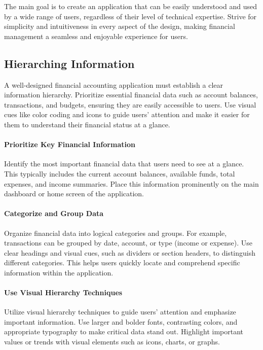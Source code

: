The main goal is to create an application that can be easily understood and used by a wide range of users, 
regardless of their level of technical expertise. Strive for simplicity and intuitiveness in every aspect of the 
design, making financial management a seamless and enjoyable experience for users.


\subsection{Hierarching Information}

A well-designed financial accounting application must establish a clear information hierarchy. Prioritize essential 
financial data such as account balances, transactions, and budgets, ensuring they are easily accessible to users. 
Use visual cues like color coding and icons to guide users' attention and make it easier for them to understand 
their financial status at a glance.

\paragraph{Prioritize Key Financial Information}
Identify the most important financial data that users need to see at a glance. 
This typically includes the current account balances, available funds, total expenses, and income summaries. Place 
this information prominently on the main dashboard or home screen of the application.

\paragraph{Categorize and Group Data}
Organize financial data into logical categories and groups. For example, transactions can 
be grouped by date, account, or type (income or expense). Use clear headings and visual cues, such as dividers or 
section headers, to distinguish different categories. This helps users quickly locate and comprehend specific 
information within the application.

\paragraph{Use Visual Hierarchy Techniques}
Utilize visual hierarchy techniques to guide users' attention and emphasize important 
information. Use larger and bolder fonts, contrasting colors, and appropriate typography to make critical data 
stand out. Highlight important values or trends with visual elements such as icons, charts, or graphs.

